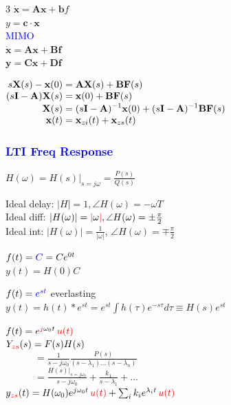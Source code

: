 \documentclass[4pt]{article}
\theoremstyle{definition}
\theoremstyle{definition}
\renewcommand{\o}{\omega}
\newcommand{\red}[1]{\textcolor{red}{#1}}
\newcommand{\blue}[1]{\textcolor{blue}{#1}}
\begin{document}
\begin{landscape}
\begin{multicols}{3}
    \(\mathbf{\dot x} = \mathbf A \mathbf x + \mathbf b f\)\\
    \(y = \mathbf{c} \cdot \mathbf x\)\\
    \blue{MIMO}\\
    \(\mathbf{\dot x} = \mathbf A \mathbf x + \mathbf B \mathbf f\)\\
    \(\mathbf y = \mathbf C \mathbf x + \mathbf D \mathbf f\)

    \(
        \setlength{\jot}{0pt} %
        \begin{aligned}
            s \mathbf X(s) - \mathbf x(0) &= \mathbf A \mathbf X(s) + \mathbf B \mathbf F(s) \\
            (s \mathbf I - \mathbf A) \mathbf X(s) &= \mathbf x(0) + \mathbf B \mathbf F(s) \\
            \mathbf X(s) &= (s \mathbf I - \mathbf A)^{-1} \mathbf x(0) + (s \mathbf I - \mathbf A)^{-1} \mathbf B \mathbf F(s)\\
            \mathbf x(t) &= \mathbf x_{zi}(t) + \mathbf x_{zs}(t)
        \end{aligned}
    \)
\subsubsection*{\blue{LTI Freq Response}}
    \(H(\o) = H(s)|_{s = j\o} = \frac{P(s)}{Q(s)}\)     %

    Ideal delay: \(|H| = 1, \angle H(\o) = -\o T\)\\      %
    Ideal diff: \(|H(\o)| = \red{|} \o \red{|}, \angle H(\o) = \pm\frac {\pi} 2\)\\
    Ideal int: \(|H(\o)| = \frac 1 {|\o|}\), \(\angle H(\o) = \mp \frac{\pi} 2\)

    \(f(t) = \blue C = Ce^{0t}\)\\
    \(y(t) = H(0) C\)

    \(f(t) = \blue{e^{st}}\) \hfill everlasting\\
    \(y(t) = h(t) * e^{st} = e^{st} \int h(\tau) e^{-s\tau} d\tau \equiv H(s) e^{st}\)

    \(f(t) = e^{\red{j} \o_0 t}\, \red{u(t)}\)\\ 
    \(Y_{\red{zs}}(s) = F(s) H(s)\)\\     
    \(\hspace{3em}= \frac 1 {s - j\o_0} \frac{P(s)}{(s-\lambda_1)...(s-\lambda_n)}\)\\
    \(\hspace{3em}= \frac{H(s)|_{s=j\o_0}}{s-j\o_0} + \frac{k_1}{s-\lambda_1} + ...\)\\
    \(y_{\red{zs}}(t) = H(\o_0)  e^{j\o_0 t} \, \red{u(t)} + \sum_i k_i e^{\lambda_i t} \, \red{u(t)}\)


\end{multicols}
\end{landscape}
\end{document}
